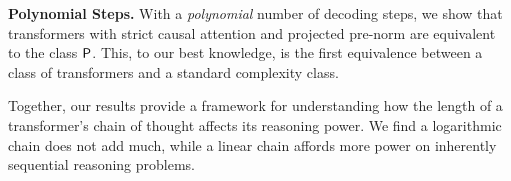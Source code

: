 \documentclass{article} %
\newcommand\change[1]{{\color{blue} #1}}
\renewcommand\change[1]{#1}
\newcommand\changeC[1]{{\color{teal} #1}}
\renewcommand\changeC[1]{#1}
\begin{document}
\begin{compactenum}
    \noindent \textbf{Polynomial Steps.}
    With a \emph{polynomial} number of decoding steps, we show that transformers \change{with strict causal attention and \changeC{projected} pre-norm} are equivalent to the class $\P$. This, to our best knowledge, is the first equivalence between a class of transformers and a standard complexity class.
\end{compactenum}
Together, our results provide a framework for understanding how the length of a transformer's chain of thought affects its reasoning power. We find a logarithmic chain does not add much, while a linear chain affords more power on inherently sequential reasoning problems.
\end{document}

